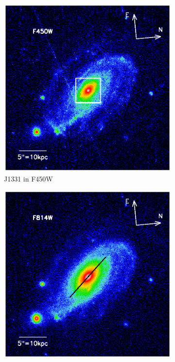 

\begin{figure}
\centering
\begin{subfigure}{.5\textwidth}
  \centering
  \includegraphics[width=.9\linewidth]{fig/first_glimpse_450.ps}
  \caption{J1331 in F450W}
  \label{fig:F450W}
\end{subfigure}%
\begin{subfigure}{.5\textwidth}
  \centering
  \includegraphics[width=.9\linewidth]{fig/first_glimpse_814.ps}

\end{subfigure}
\end{figure}
